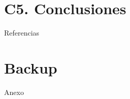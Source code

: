 \documentclass{beamer}
\begin{document}
\section{C5. Conclusiones}



\begin{frame}[allowframebreaks]{Referencias}
\tiny{
\printbibliography
}
\end{frame}

\appendix

\section*{Backup}

\begin{frame}
\Huge
\centering
Anexo
\end{frame}






\end{document}

